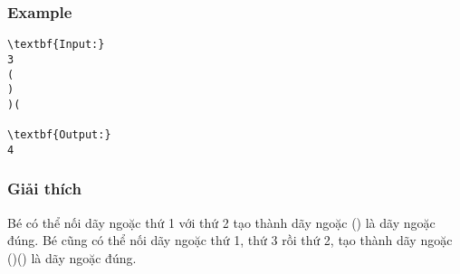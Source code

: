 \subsubsection{   Example  }
\begin{verbatim}
\textbf{Input:}
3
(
)
)(

\textbf{Output:}
4
\end{verbatim}

\subsubsection{   Giải thích  }

   Bé có thể nối dãy ngoặc thứ 1 với thứ 2 tạo thành dãy ngoặc () là dãy ngoặc đúng. Bé cũng có thể nối dãy ngoặc thứ 1, thứ 3 rồi thứ 2, tạo thành dãy ngoặc ()() là dãy ngoặc đúng.  
